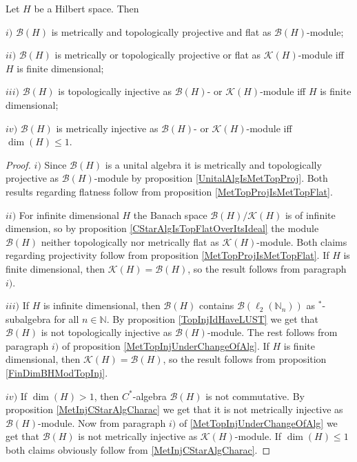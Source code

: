 \begin{proposition}\label{KHAndBHModBH} Let $H$ be a Hilbert space. Then

$i)$ $\mathcal{B}(H)$ is metrically and topologically projective and flat as $\mathcal{B}(H)$-module;

$ii)$ $\mathcal{B}(H)$ is metrically or topologically projective or flat as $\mathcal{K}(H)$-module iff $H$ is finite dimensional;

$iii)$ $\mathcal{B}(H)$ is topologically injective as $\mathcal{B}(H)$- or $\mathcal{K}(H)$-module iff $H$ is finite dimensional;

$iv)$ $\mathcal{B}(H)$ is metrically injective as $\mathcal{B}(H)$- or $\mathcal{K}(H)$-module iff $\dim(H)\leq 1$.
\end{proposition}
\begin{proof} $i)$ Since $\mathcal{B}(H)$ is a unital algebra it is metrically and topologically projective as $\mathcal{B}(H)$-module by proposition \ref{UnitalAlgIsMetTopProj}. Both results regarding flatness follow from proposition \ref{MetTopProjIsMetTopFlat}.

$ii)$ For infinite dimensional $H$ the Banach space $\mathcal{B}(H)/\mathcal{K}(H)$ is of infinite dimension, so by proposition \ref{CStarAlgIsTopFlatOverItsIdeal} the module $\mathcal{B}(H)$ neither topologically nor metrically flat as $\mathcal{K}(H)$-module. Both claims regarding projectivity follow from proposition \ref{MetTopProjIsMetTopFlat}. If $H$ is finite dimensional, then $\mathcal{K}(H)=\mathcal{B}(H)$, so the result follows from paragraph $i)$.

$iii)$ If $H$ is infinite dimensional, then $\mathcal{B}(H)$ contains $\mathcal{B}(\ell_2(\mathbb{N}_n))$ as ${}^*$-subalgebra for all $n\in\mathbb{N}$. By proposition \ref{TopInjIdHaveLUST} we get that $\mathcal{B}(H)$ is not topologically injective as $\mathcal{B}(H)$-module. The rest follows from paragraph $i)$ of proposition \ref{MetTopInjUnderChangeOfAlg}. If $H$ is finite dimensional, then $\mathcal{K}(H)=\mathcal{B}(H)$, so the result follows from proposition \ref{FinDimBHModTopInj}.

$iv)$ If $\dim(H)>1$, then $C^*$-algebra $\mathcal{B}(H)$ is not commutative. By  proposition \ref{MetInjCStarAlgCharac} we get that it is not metrically injective as $\mathcal{B}(H)$-module. Now from paragraph $i)$ of \ref{MetTopInjUnderChangeOfAlg} we get that $\mathcal{B}(H)$ is not metrically injective as $\mathcal{K}(H)$-module. If $\dim(H)\leq 1$ both claims obviously follow from \ref{MetInjCStarAlgCharac}.
\end{proof}

